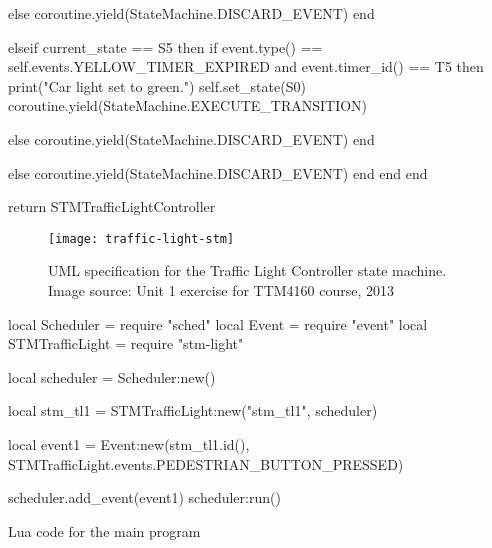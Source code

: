 \begin{appendices}
\begin{listing}[H]
\begin{luacode}
			else
				coroutine.yield(StateMachine.DISCARD_EVENT)
			end

		elseif current_state == S5 then
			if event.type() == self.events.YELLOW_TIMER_EXPIRED
			     and event.timer_id() == T5 then
				print("Car light set to green.")
				self.set_state(S0)
				coroutine.yield(StateMachine.EXECUTE_TRANSITION)
			
			else
				coroutine.yield(StateMachine.DISCARD_EVENT)
			end

		else
			coroutine.yield(StateMachine.DISCARD_EVENT)
		end
	end
end

return STMTrafficLightController		
\end{luacode}
\end{listing}

\begin{figure}[H]
	\centering
	\texttt{[image: traffic-light-stm]}
	\caption[UML specification for Traffic Light Controller]{UML specification for the Traffic Light Controller state machine. Image source: Unit 1 exercise for TTM4160 course, 2013}
	\label{fig:traffic_light_uml}
\end{figure}

\begin{listing}[H]
\begin{luacode}
local Scheduler = require "sched"
local Event = require "event"
local STMTrafficLight = require "stm-light"

local scheduler = Scheduler:new()

local stm_tl1 = STMTrafficLight:new("stm_tl1", scheduler)

local event1 = Event:new(stm_tl1.id(), STMTrafficLight.events.PEDESTRIAN_BUTTON_PRESSED)

scheduler.add_event(event1)
scheduler:run()	
\end{luacode}
	\caption{Lua code for the main program}
	\label{code:main}
\end{listing}

\begin{listing}
\begin{luacode}


\end{luacode}
\end{listing}

\end{appendices}